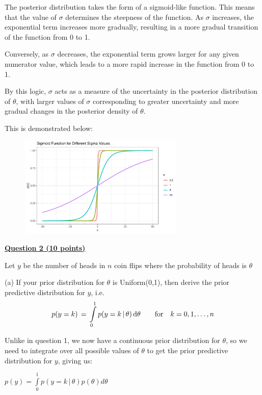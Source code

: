 \documentclass[12pt]{article}
\begin{document}
The posterior distribution takes the form of a sigmoid-like function. This means that the value of $\sigma$ determines
the steepness of the function. As $\sigma$ increases, the exponential term increases more gradually, resulting in a more
gradual transition of the function from 0 to 1.


Conversely, as $\sigma$ decreases, the exponential term grows larger for any given numerator value, which leads to a more
rapid increase in the function from 0 to 1.

By this logic, $\sigma$ acts as a measure of the uncertainty in the posterior distribution of $\theta$, with larger values
of $\sigma$ corresponding to greater uncertainty and more gradual changes in the posterior density of $\theta$.

This is demonstrated below:

\begin{figure}[h]
    \centering
    \includegraphics[width=0.7\textwidth]{q1c_plot.pdf}
\end{figure}

\bigskip

{\underline{\bf Question 2 (10 points)}}  

Let $y$ be the number of heads in $n$ coin flips where the probability of heads is $\theta$

(a) If your prior distribution for $\theta$ is Uniform(0,1), then derive the prior predictive
distribution for $y$, i.e.
\begin{eqnarray*}
p(y = k) \, = \, \int\limits_0^1 p(y = k \, | \, \theta) \, {\rm d} \theta  \qquad {\rm for} \quad k = 0,1,\ldots,n
\end{eqnarray*}

Unlike in question 1, we now have a continuous prior distribution for $\theta$, so we need to integrate
over all possible values of $\theta$ to get the prior predictive distribution for $y$, giving us:

$p(y) = \int\limits_0^1 p(y = k \, | \, \theta)p(\theta)d\theta$
\end{document}
